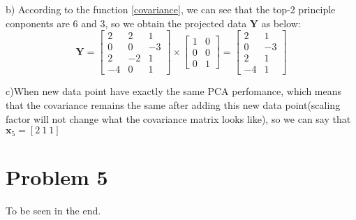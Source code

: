 \documentclass{article}
\begin{document}
b) According to the function \ref{covariance}, we can see that the top-2 principle conponents are 6 and 3, so we obtain the projected data $\bm{Y}$ as below:
\begin{equation}
	\bm{Y} = \left[
	\begin{array}{ccc}
	2 & 2 & 1\\
	0 & 0 & -3\\
	2 & -2 & 1\\
	-4 & 0 & 1	
	\end{array}
	\right]	\times
	\left[
	\begin{array}{cc}
		1 & 0\\
		0 & 0\\
		0 & 1
	\end{array}
	\right] = 
	\left[
		\begin{array}{ccc}
			2 & 1\\
			0 & -3\\
			2 & 1\\
			-4 & 1	
		\end{array}
	\right]
\end{equation}

c)When new data point have exactly the same PCA perfomance, which means that the covariance remains the same after adding this new data point(scaling factor will not change what the covariance matrix looks like), so we can say that $\bm{x}_5 = [2 \ 1 \ 1]$

\section*{Problem 5}
To be seen in the end.

\small


\end{document}
